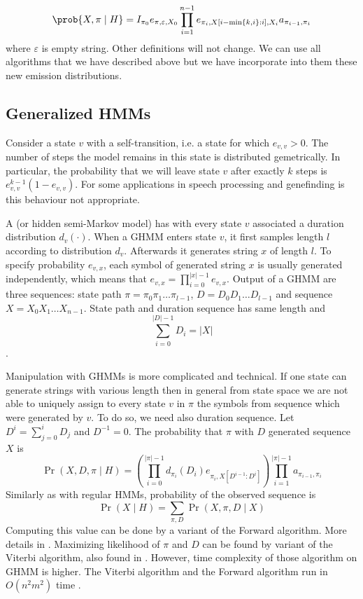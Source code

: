 \[
\prob{X,\pi\mid H} = 
I_{\pi_0}e_{\pi,\varepsilon,X_0}\prod_{i=1}^{n-1}
e_{\pi_i,X[i-\min\{k,i\}:i],X_i}a_{\pi_{i-1},\pi_i}
\]
where $\varepsilon$ is empty string. Other definitions will not change. We can
use all algorithms that we have described above but we have incorporate into
them these new emission distributions.


\subsection{Generalized HMMs}

Consider a state $v$ with a self-transition, i.e. a state for which $e_{v,v}>0$.
The number of steps the model remains in this state is distributed gemetrically.
In particular, the probability that we will leave state $v$ after exactly $k$ steps is
$e_{v,v}^{k-1}(1-e_{v,v})$. For some
applications in speech processing and genefinding is this behaviour not
appropriate\cite{}.

A  (or hidden semi-Markov model)
has with every state $v$ associated a duration distribution $d_v(\cdot)$.  When
a GHMM enters state $v$, it first samples length $l$ according
to distribution $d_v$.  Afterwards it generates string $x$ of length $l$.  To
specify probability $e_{v,x}$, each symbol of generated string $x$ is usually
generated independently, which means that $e_{v,x}=\prod_{i=0}^{|x|-1}e_{v,x}$.
Output of a GHMM are three sequences: state path $\pi=\pi_0\pi_1\dots\pi_{l-1}$,
 $D=D_0D_1\dots D_{l-1}$ and sequence
$X=X_0X_1\dots X_{n-1}$.  State path and duration sequence has same
length and \[\sum_{i=0}^{|D|-1}D_i = |X|\].

Manipulation with GHMMs is  more complicated and technical. If one state can
generate strings with various length then in general from state space we are
not able to uniquely assign to every state $v$ in $\pi$ the symbols from
sequence which were generated by $v$. To do so, we need also duration sequence.
Let $D^i = \sum_{j=0}^{i}D_j$ and $D^{-1}=0$.
The probability that $\pi$ with $D$ generated sequence $X$ is
\begin{equation}
\Pr(X,D,\pi\mid H) = 
\left(
\prod_{i=0}^{|\pi|-1}
d_{\pi_i}(D_i)e_{\pi_i,X[D^{i-1}:D^i]}
\right)
\prod_{i=1}^{|\pi|-1}
a_{\pi_{i-1},\pi_i}
\end{equation}
Similarly as with regular HMMs,  probability of the observed
sequence is
\begin{equation}
\Pr\left(X\mid H\right) = \sum_{\pi,D}\Pr\left(X,\pi,D\mid X\right)
\end{equation}
Computing this value can be done by a variant of the Forward algorithm. More
details 
in \cite{}. Maximizing likelihood of $\pi$ and $D$ can be found by variant of
the Viterbi algorithm, also found in \cite{}. However, time complexity of those
algorithm on GHMM is higher. The Viterbi algorithm and the Forward algorithm
run in $O(n^2m^2)$ time \cite{}.


